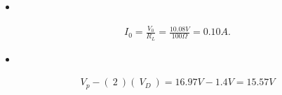 \begin{itemize}
\item {\bfseries\itshape{}} \hfill \break
{\bfseries\itshape{}}
\end{itemize}

\begin{ceqn}
\begin{align}
I_{0} = \frac{V_{0}}{R_{L}} = \frac{10.08V}{100\Omega} = 0.10 A.
\end{align}
\end{ceqn}

\begin{itemize}
\item {\bfseries\itshape{}} \hfill \break
\end{itemize}

\begin{ceqn}
\begin{align}
V_{p} - (\ 2\ )(\ V_{D}\ ) = 16.97V - 1.4V = 15.57 V
\end{align}
\end{ceqn}

\pagebreak